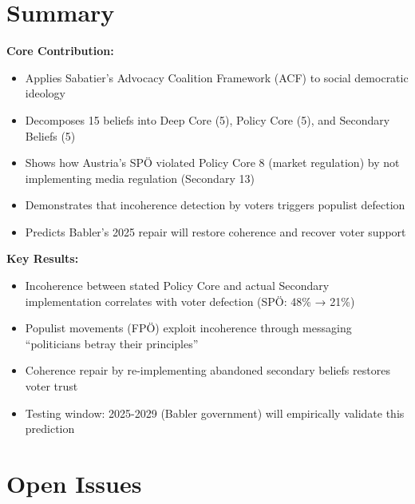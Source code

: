
\section{Summary}
\label{sec:cj-summary}

\begin{tcolorbox}[colback=green!10!white, colframe=green!75!black,
    title=Appendix UNMAPPED_CJ: Summary]

\textbf{Core Contribution:}
\begin{itemize}[nosep]
    \item Applies Sabatier's Advocacy Coalition Framework (ACF) to social democratic ideology
    \item Decomposes 15 beliefs into Deep Core (5), Policy Core (5), and Secondary Beliefs (5)
    \item Shows how Austria's SPÖ violated Policy Core 8 (market regulation) by not implementing media regulation (Secondary 13)
    \item Demonstrates that incoherence detection by voters triggers populist defection
    \item Predicts Babler's 2025 repair will restore coherence and recover voter support
\end{itemize}

\textbf{Key Results:}
\begin{itemize}[nosep]
    \item Incoherence between stated Policy Core and actual Secondary implementation correlates with voter defection (SPÖ: 48\% → 21\%)
    \item Populist movements (FPÖ) exploit incoherence through messaging ``politicians betray their principles''
    \item Coherence repair by re-implementing abandoned secondary beliefs restores voter trust
    \item Testing window: 2025-2029 (Babler government) will empirically validate this prediction
\end{itemize}

\end{tcolorbox}


\section{Open Issues}
\label{sec:cj-open}

